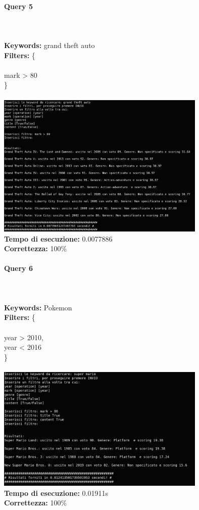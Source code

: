 \documentclass[12pt]{article}
\begin{document}
\paragraph{Query 5} ~ \\ \\

\noindent \textbf{Keywords: } grand theft auto \\
\textbf{Filters: } \{ \\ \\
\indent mark > 80 \\
\} \\\\

\noindent \includegraphics[width=100mm]{Immagini/Image5.png} \\
\textbf{Tempo di esecuzione:} 0.0077886 \\
\textbf{Correttezza:} 100\% \pagebreak

\paragraph{Query 6} ~ \\ \\

\noindent \textbf{Keywords: } Pokemon \\
\textbf{Filters: } \{ \\ \\
\indent year > 2010, \\
\indent year < 2016 \\
\} \\\\

\noindent \includegraphics[width=100mm]{Immagini/Image6.png} \\
\textbf{Tempo di esecuzione:} 0.01911s \\
\textbf{Correttezza:} 100\% \pagebreak
\end{document}
